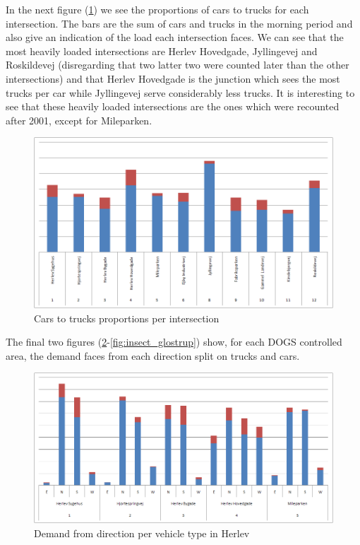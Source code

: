 In the next figure (\ref{fig:cars2trucks_insect}) we see the proportions of cars to trucks for each intersection. The bars are the sum of cars and trucks in the morning period and also give an indication of the load each intersection faces. We can see that the most heavily loaded intersections are Herlev Hovedgade, Jyllingevej and Roskildevej (disregarding that two latter two were counted later than the other intersections) and that Herlev Hovedgade is the junction which sees the most trucks per car while Jyllingevej serve considerably less trucks. It is interesting to see that these heavily loaded intersections are the ones which were recounted after 2001, except for Mileparken.

\begin{figure}[!ht]
\centering
\includegraphics[scale=0.35]{cars_vs_trucks_all_intersections.png}
\caption{Cars to trucks proportions per intersection}
\label{fig:cars2trucks_insect}
\end{figure}

The final two figures (\ref{fig:insect_herlev}-\ref{fig:insect_glostrup}) show, for each DOGS controlled area, the demand faces from each direction split on trucks and cars. 

\begin{figure}[ht]
\centering
\includegraphics[scale=0.30]{demand_from_direction_per_intersection_herlev.png}
\caption{Demand from direction per vehicle type in Herlev}
\label{fig:insect_herlev}
\end{figure}  
    
